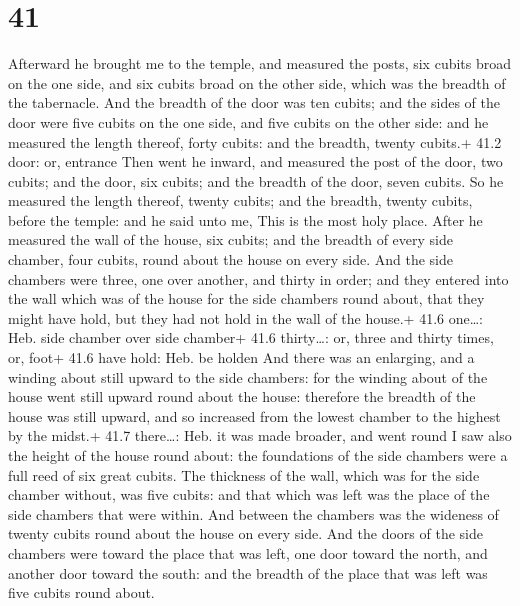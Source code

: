 \hypertarget{section-40}{%
\section{41}\label{section-40}}

 Afterward he brought me to the temple, and measured the
posts, six cubits broad on the one side, and six cubits broad on the
other side, which was the breadth of the tabernacle.  And
the breadth of the door was ten cubits; and the sides of the door were
five cubits on the one side, and five cubits on the other side: and he
measured the length thereof, forty cubits: and the breadth, twenty
cubits.+ 41.2 door: or, entrance  Then went he inward, and
measured the post of the door, two cubits; and the door, six cubits; and
the breadth of the door, seven cubits.  So he measured the
length thereof, twenty cubits; and the breadth, twenty cubits, before
the temple: and he said unto me, This is the most holy place.
 After he measured the wall of the house, six cubits; and
the breadth of every side chamber, four cubits, round about the house on
every side.  And the side chambers were three, one over
another, and thirty in order; and they entered into the wall which was
of the house for the side chambers round about, that they might have
hold, but they had not hold in the wall of the house.+ 41.6 one\ldots:
Heb. side chamber over side chamber+ 41.6 thirty\ldots: or, three and
thirty times, or, foot+ 41.6 have hold: Heb. be holden  And
there was an enlarging, and a winding about still upward to the side
chambers: for the winding about of the house went still upward round
about the house: therefore the breadth of the house was still upward,
and so increased from the lowest chamber to the highest by the midst.+
41.7 there\ldots: Heb. it was made broader, and went round 
I saw also the height of the house round about: the foundations of the
side chambers were a full reed of six great cubits.  The
thickness of the wall, which was for the side chamber without, was five
cubits: and that which was left was the place of the side chambers that
were within.  And between the chambers was the wideness of
twenty cubits round about the house on every side.  And the
doors of the side chambers were toward the place that was left, one door
toward the north, and another door toward the south: and the breadth of
the place that was left was five cubits round about.

